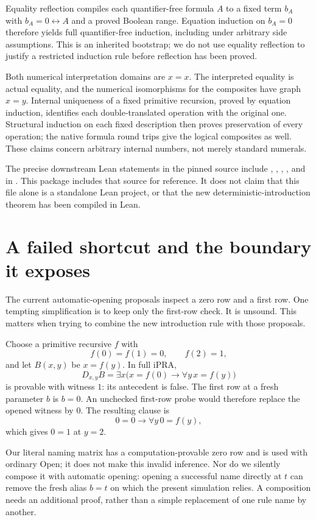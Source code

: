 Equality reflection compiles each quantifier-free formula $A$ to a fixed
term $b_A$ with $b_A=0\leftrightarrow A$ and a proved Boolean range. Equation
induction on $b_A=0$ therefore yields full quantifier-free induction,
including under arbitrary side assumptions. This is an inherited bootstrap;
we do not use equality reflection to justify a restricted induction rule
before reflection has been proved.

Both numerical interpretation domains are $x=x$. The interpreted equality
is actual equality, and the numerical isomorphisms for the composites have
graph $x=y$. Internal uniqueness of a fixed primitive recursion, proved by
equation induction, identifies each double-translated operation with the
original one. Structural induction on each fixed description then proves
preservation of every operation; the native formula round trips give the
logical composites as well. These claims concern arbitrary internal numbers,
not merely standard numerals.

The precise downstream Lean statements in the pinned source include
, ,
, , and
 in
. This package includes
that source for reference. It does not claim that this file alone is a
standalone Lean project, or that the new deterministic-introduction theorem
has been compiled in Lean.

\section{A failed shortcut and the boundary it exposes}

The current automatic-opening proposals inspect a zero row and a first row.
One tempting simplification is to keep only the first-row check. It is
unsound. This matters when trying to combine the new introduction rule with
those proposals.

Choose a primitive recursive $f$ with
\[
 f(0)=f(1)=0,\qquad f(2)=1,
\]
and let $B(x,y)$ be $x=f(y)$. In full iPRA,
\[
 D_{x,y}B=\exists x\bigl(x=f(0)\to\forall y\,x=f(y)\bigr)
\]
is provable with witness $1$: its antecedent is false. The first row at a
fresh parameter $b$ is $b=0$. An unchecked first-row probe would therefore
replace the opened witness by $0$. The resulting clause is
\[
 0=0\to\forall y\,0=f(y),
\]
which gives $0=1$ at $y=2$.

Our literal naming matrix has a computation-provable zero row and is used
with ordinary Open; it does not make this invalid inference. Nor do we
silently compose it with automatic opening: opening a successful name
directly at $t$ can remove the fresh alias $b=t$ on which the present
simulation relies. A composition needs an additional proof, rather than a
simple replacement of one rule name by another.


